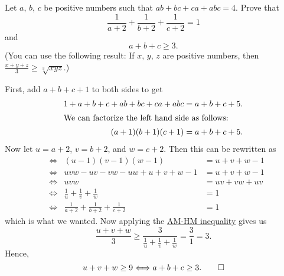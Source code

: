 \begin{question}
    Let $a$, $b$, $c$ be positive numbers such that $ab + bc + ca + abc = 4$.
    Prove that 
    \[\frac{1}{a + 2} + \frac{1}{b + 2} + \frac{1}{c + 2} = 1\]
    and
    \[a + b + c \geq 3.\]
    (You can use the following result: If $x$, $y$, $z$ are positive numbers,
    then $\frac{x + y + z}{3} \geq \sqrt[3]{xyz}$.)
\end{question}
\begin{solution}
    First, add $a + b + c + 1$ to both sides to get
    \begin{align*}
        1 + a + b + c + ab + bc + ca + abc &= a + b + c + 5.\\
        \intertext{We can factorize the left hand side as follows:}
        (a + 1)(b + 1)(c + 1) &= a + b + c + 5.
    \end{align*}
    Now let $u = a + 2$, $v = b + 2$, and $w = c + 2$. Then this can be
    rewritten as
    \begin{align*}
        &\Longleftrightarrow& (u - 1)(v - 1)(w - 1) &= u + v + w - 1\\
        &\Longleftrightarrow& uvw - uv - vw - uw + u + v + w - 1 &= u + v + w - 1\\
        &\Longleftrightarrow& uvw &= uv + vw + uv\\
        &\Longleftrightarrow& \frac{1}{u} + \frac{1}{v} + \frac{1}{w} &= 1\\
        &\Longleftrightarrow& \frac{1}{a + 2} + \frac{1}{b + 2} + \frac{1}{c + 2} &= 1
    \end{align*}
    which is what we wanted. Now applying the \hyperref[thm: amgm]{AM-HM
    inequality} gives us
    \[\frac{u + v + w}{3} \geq \frac{3}{\frac{1}{u} + \frac{1}{v} + \frac{1}{w}} = \frac{3}{1} = 3.\] 
    Hence, 
    \[u + v + w \geq 9 \Longleftrightarrow a + b + c \geq 3. \qedhere\]
\end{solution}

